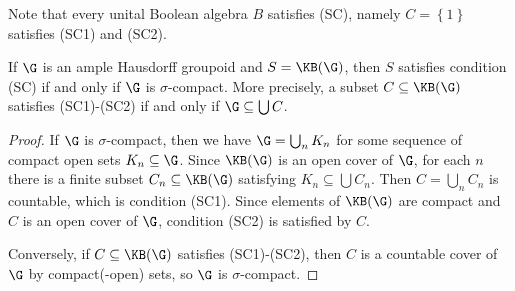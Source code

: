 Note that every unital Boolean algebra $B$ satisfies (SC), namely $C=\left\{1\right\}$ satisfies (SC1) and (SC2).

\begin{proposition}\label{propositionamplescsigmacompact}
If $\G$ is an ample Hausdorff groupoid and $S=\KB(\G)$, then $S$ satisfies condition (SC) if and only if $\G$ is $\sigma$-compact. More precisely, a subset $C\subseteq\KB(\G)$ satisfies (SC1)-(SC2) if and only if $\G\subseteq\bigcup C$.
\end{proposition}
\begin{proof}
If $\G$ is $\sigma$-compact, then we have $\G=\bigcup_n K_n$ for some sequence of compact open sets $K_n\subseteq\G$. Since $\KB(\G)$ is an open cover of $\G$, for each $n$ there is a finite subset $C_n\subseteq\KB(\G)$ satisfying $K_n\subseteq\bigcup C_n$. Then $C=\bigcup_n C_n$ is countable, which is condition (SC1). Since elements of $\KB(\G)$ are compact and $C$ is an open cover of $\G$, condition (SC2) is satisfied by $C$.

Conversely, if $C\subseteq\KB(\G)$ satisfies (SC1)-(SC2), then $C$ is a countable cover of $\G$ by compact(-open) sets, so $\G$ is $\sigma$-compact.\qedhere
\end{proof}


